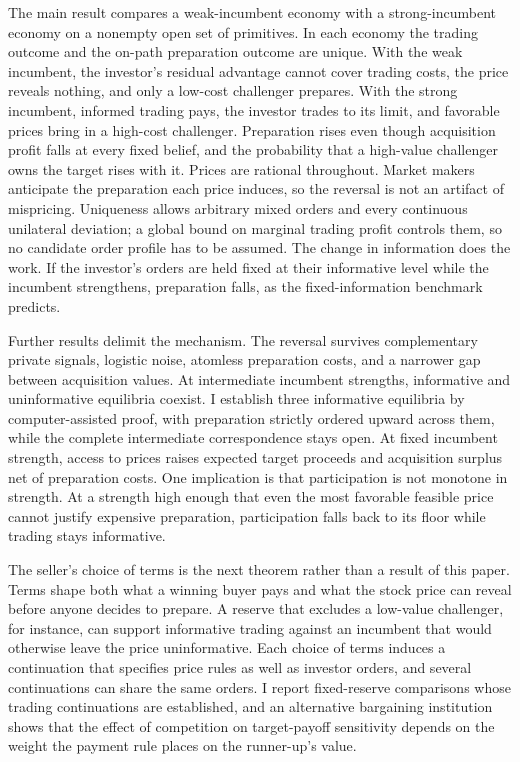 \documentclass[
  12pt,
]{article}
\begin{document}
The main result compares a weak-incumbent economy with a
strong-incumbent economy on a nonempty open set of primitives. In each
economy the trading outcome and the on-path preparation outcome are
unique. With the weak incumbent, the investor's residual advantage
cannot cover trading costs, the price reveals nothing, and only a
low-cost challenger prepares. With the strong incumbent, informed
trading pays, the investor trades to its limit, and favorable prices
bring in a high-cost challenger. Preparation rises even though
acquisition profit falls at every fixed belief, and the probability that
a high-value challenger owns the target rises with it. Prices are
rational throughout. Market makers anticipate the preparation each price
induces, so the reversal is not an artifact of mispricing. Uniqueness
allows arbitrary mixed orders and every continuous unilateral deviation;
a global bound on marginal trading profit controls them, so no candidate
order profile has to be assumed. The change in information does the
work. If the investor's orders are held fixed at their informative level
while the incumbent strengthens, preparation falls, as the
fixed-information benchmark predicts.

Further results delimit the mechanism. The reversal survives
complementary private signals, logistic noise, atomless preparation
costs, and a narrower gap between acquisition values. At intermediate
incumbent strengths, informative and uninformative equilibria coexist. I
establish three informative equilibria by computer-assisted proof, with
preparation strictly ordered upward across them, while the complete
intermediate correspondence stays open. At fixed incumbent strength,
access to prices raises expected target proceeds and acquisition surplus
net of preparation costs. One implication is that participation is not
monotone in strength. At a strength high enough that even the most
favorable feasible price cannot justify expensive preparation,
participation falls back to its floor while trading stays informative.

The seller's choice of terms is the next theorem rather than a result of
this paper. Terms shape both what a winning buyer pays and what the
stock price can reveal before anyone decides to prepare. A reserve that
excludes a low-value challenger, for instance, can support informative
trading against an incumbent that would otherwise leave the price
uninformative. Each choice of terms induces a continuation that
specifies price rules as well as investor orders, and several
continuations can share the same orders. I report fixed-reserve
comparisons whose trading continuations are established, and an
alternative bargaining institution shows that the effect of competition
on target-payoff sensitivity depends on the weight the payment rule
places on the runner-up's value.
\end{document}
